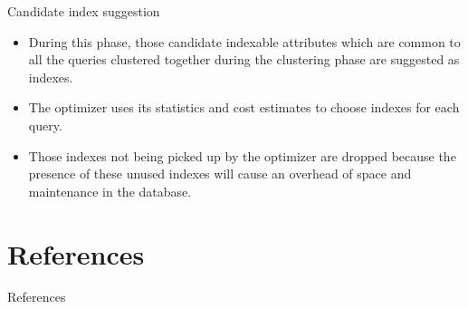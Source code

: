\documentclass[Serif, 10pt, brown]{beamer}
\theoremstyle{example}
\theoremstyle{plain}
\begin{document}
\begin{frame}{Candidate index suggestion}
	\begin{itemize}
		\item During this phase, those candidate indexable attributes which are common to all the queries clustered together during the clustering phase are suggested as indexes.
		\item The optimizer uses its statistics and cost estimates to choose indexes for each query.
		\item Those indexes not being picked up by the optimizer are dropped because the presence of these unused indexes will cause an overhead of space and maintenance in the database.
	\end{itemize}
\end{frame}



\section{References}
\begin{frame}{References}
	
    
\end{frame}
\end{document}
